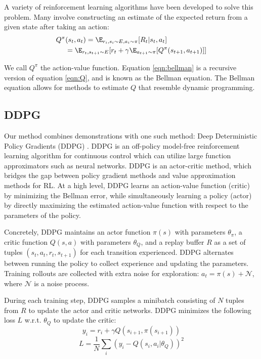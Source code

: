 A variety of reinforcement learning algorithms have been developed to solve this problem. Many involve constructing an estimate of the expected return from a given state after taking an action:
\begin{align}
    Q^\pi & (s_t, a_t) = \E_{r_i, s_i \sim E, a_i \sim \pi}[R_t|s_t, a_t] \label{eqn:Q} \\
                   & = \E_{r_t, s_{t+1} \sim E}[r_t + \gamma \E_{a_{t+1} \sim \pi}[Q^\pi(s_{t+1}, a_{t+1})]] \label{eqn:bellman}
\end{align}

\noindent We call $Q^\pi$ the action-value function. Equation \ref{eqn:bellman} is a recursive version of equation \ref{eqn:Q}, and is known as the Bellman equation. The Bellman equation allows for methods to estimate $Q$ that resemble dynamic programming.

\subsection{DDPG}

Our method combines demonstrations with one such method: Deep Deterministic Policy Gradients (DDPG) \cite{lillicrap2015continuous}. 
DDPG is an off-policy model-free reinforcement learning algorithm for continuous control which can utilize large function approximators such as neural networks. DDPG is an actor-critic method, which bridges the gap between policy gradient methods and value approximation methods for RL. At a high level, DDPG learns an action-value function (critic) by minimizing the Bellman error, while simultaneously learning a policy (actor) by directly maximizing the estimated action-value function with respect to the parameters of the policy.

Concretely, DDPG maintains an actor function $\pi(s)$ with parameters $\theta_\pi$, a critic function $Q(s, a)$ with parameters $\theta_Q$, and a replay buffer $R$ as a set of tuples $(s_t, a_t, r_t, s_{t+1})$ for each transition experienced. DDPG alternates between running the policy to collect experience and updating the parameters. Training rollouts are collected with extra noise for exploration: $a_t = \pi(s) + \mathcal{N}$, where $\mathcal{N}$ is a noise process.

During each training step, DDPG samples a minibatch consisting of $N$ tuples from $R$ to update the actor and critic networks. DDPG minimizes the following loss $L$ w.r.t. $\theta_Q$ to update the critic:
\begin{equation} \label{eq:target}
    y_i = r_i + \gamma Q(s_{i+1}, \pi(s_{i+1}))
\end{equation}
\begin{equation}
    L = \frac{1}{N}\sum_i (y_i - Q(s_i, a_i|\theta_Q))^2
\end{equation}

